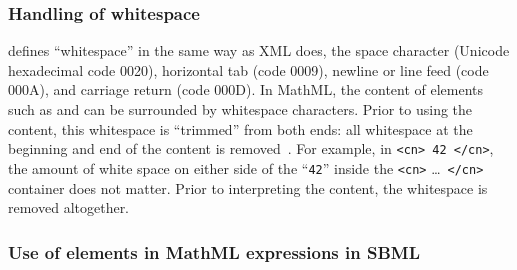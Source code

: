 \subsubsection{Handling of whitespace}
\label{sec:mathml-whitespace}

\mathmltwo defines ``whitespace'' in the same way as XML does, \ie
the space character (Unicode hexadecimal code 0020), horizontal
tab (code 0009), newline or line feed (code 000A), and carriage
return (code 000D).  In MathML, the content of elements such as
 and  can be surrounded by whitespace
characters.  Prior to using the content, this whitespace is
``trimmed'' from both ends: all whitespace at the beginning and
end of the content is removed~\citep{ausbrooks:2003}.  For
example, in \texttt{<cn> 42 </cn>}, the amount of white space on
either side of the ``\texttt{42}'' inside the \texttt{<cn>}
\ldots\ \texttt{</cn>} container does not matter.  Prior to
interpreting the content, the whitespace is removed altogether.


\subsubsection{Use of  elements in MathML expressions in SBML}
\label{sec:csymbol-token}
\label{sec:csymbol}

